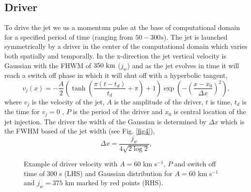 \documentclass[12pt]{ociamthesis}
\newcommand{\fref}[1]{Fig. \eqref{#1}}
\begin{document}
\subsection{Driver}
\label{subsec:driver}
To drive the jet we us a momentum pulse at the base of computational domain for a specified period of time (ranging from $50-300s$). The jet is launched symmetrically by a driver in the center of the computational domain which varies both spatially and temporally. In the x-direction the jet vertical velocity is Gaussian with the FHWM of $350 \ \rm{km}$ ($j_w$) and as the jet evolves in time it will reach a switch off phase in which it will shut off with a hyperbolic tangent,
\begin{equation}
v_{j}(x) = -\frac{A}{2} \left( \tanh \left( \frac{\pi (t-t_{d})}{t_d}+ \pi \right) +1 \right) \exp \left( - \left(\frac{x-x_0}{\Delta x} \right)^2  \right),
\end{equation}    
where $v_j$ is the velocity of the jet, $A$ is the amplitude of the driver, $t$ is time, $t_{d}$ is the time for $v_j=0$ , $P$ is the period of the driver and $x_0$ is central location of the jet injection. The driver the width of the Gaussian is determined by $\Delta x$ which is the FWHM based of the jet width (see \fref{fig4}),
\begin{equation}
\Delta x = \dfrac{j_w}{4 \sqrt{2 \log{2}}},
\end{equation}  
\begin{figure}
\hspace{-1.5cm}
\captionsetup[subfigure]{labelformat=empty}
\caption{Example of driver velocity with $A=60$ km s$^{-1}$, $P$ and switch off time of $300$ s (LHS) and Gaussian distribution for $A=60$ km s$^{-1}$ and $j_w=375$ km marked by red points (RHS).}
\label{fig4}
\end{figure}
\end{document}
